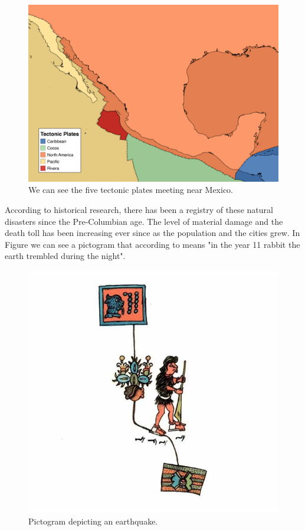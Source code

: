\begin{figure}[h]
  \centering
  \includegraphics[width=1\textwidth]{images/plates.png}
  \caption{We can see the five tectonic plates meeting near Mexico.}
  \label{fig:plates}
\end{figure}


According to historical research, there has been a registry of these natural disasters since the Pre-Columbian age. The level of material damage and the death toll has been increasing ever since as the population and the cities grew. In Figure \cite{fig:codice} we can see a pictogram that according to \cite{sismosmexico} means "in the year 11 rabbit the earth trembled during the night".\\


\begin{figure}[h]
  \centering
  \includegraphics[width=1\textwidth]{images/codice.jpg}
  \caption{Pictogram depicting an earthquake.}
  \label{fig:pictogram}
\end{figure}


